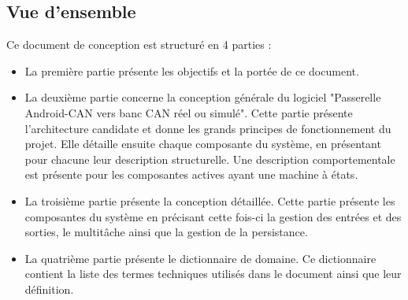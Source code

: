 \newpage
\subsection{Vue d'ensemble} %
Ce document de conception est structuré en 4 parties :
\begin{itemize} 
    \item La première partie présente les objectifs et la portée de ce document.
    \item La deuxième partie concerne la conception générale du logiciel "Passerelle Android-CAN vers banc CAN réel ou simulé". Cette partie présente l'architecture candidate et donne les grands principes de fonctionnement
    du projet. Elle détaille ensuite chaque composante du système, en présentant pour chacune leur description structurelle. Une description comportementale est présente
    pour les composantes actives ayant une machine à états.
    \item La troisième partie présente la conception détaillée. Cette partie présente les composantes du système en précisant cette fois-ci la gestion des entrées et des sorties, le multitâche ainsi que la gestion de la persistance. 
    \item La quatrième partie présente le dictionnaire de domaine. Ce dictionnaire contient la liste des termes techniques utilisés dans le document ainsi que leur définition.
\end{itemize}
\newpage